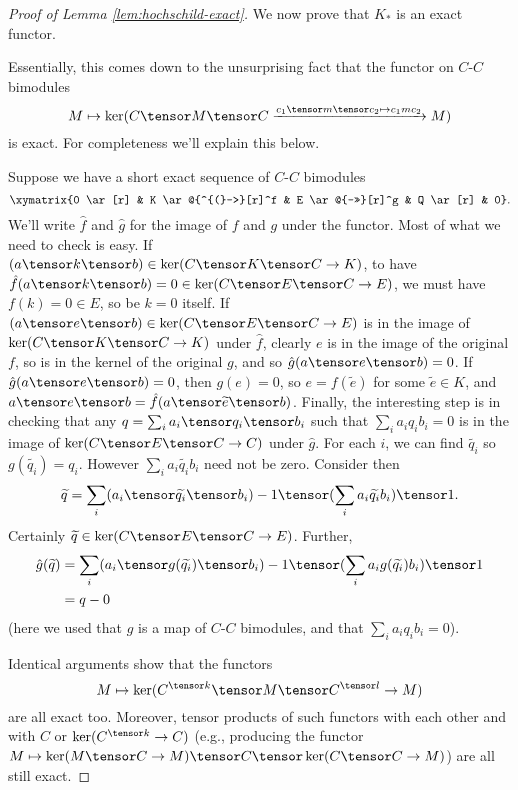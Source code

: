 \begin{proof}[Proof of Lemma \ref{lem:hochschild-exact}]
We now prove that $K_*$ is an exact functor.

Essentially, this comes down to the unsurprising fact that the functor on $C$-$C$ bimodules
\begin{equation*}
M \mapsto \ker(C \tensor M \tensor C \xrightarrow{c_1 \tensor m \tensor c_2 \mapsto c_1 m c_2} M)
\end{equation*}
is exact. For completeness we'll explain this below.

Suppose we have a short exact sequence of $C$-$C$ bimodules $$\xymatrix{0 \ar[r] & K \ar@{^{(}->}[r]^f & E \ar@{->>}[r]^g & Q \ar[r] & 0}.$$
We'll write $\hat{f}$ and $\hat{g}$ for the image of $f$ and $g$ under the functor.
Most of what we need to check is easy.
If $(a \tensor k \tensor b) \in \ker(C \tensor K \tensor C \to K)$, to have $\hat{f}(a \tensor k \tensor b) = 0 \in \ker(C \tensor E \tensor C \to E)$, we must have $f(k) = 0 \in E$, so
be $k=0$ itself. If $(a \tensor e \tensor b) \in \ker(C \tensor E \tensor C \to E)$ is in the image of $\ker(C \tensor K \tensor C \to K)$ under $\hat{f}$, clearly
$e$ is in the image of the original $f$, so is in the kernel of the original $g$, and so $\hat{g}(a \tensor e \tensor b) = 0$.
If $\hat{g}(a \tensor e \tensor b) = 0$, then $g(e) = 0$, so $e = f(\widetilde{e})$ for some $\widetilde{e} \in K$, and $a \tensor e \tensor b = \hat{f}(a \tensor \widetilde{e} \tensor b)$.
Finally, the interesting step is in checking that any $q = \sum_i a_i \tensor q_i \tensor b_i$ such that $\sum_i a_i q_i b_i = 0$ is in the image of $\ker(C \tensor E \tensor C \to C)$ under $\hat{g}$.
For each $i$, we can find $\widetilde{q_i}$ so $g(\widetilde{q_i}) = q_i$. However $\sum_i a_i \widetilde{q_i} b_i$ need not be zero.
Consider then $$\widetilde{q} = \sum_i (a_i \tensor \widetilde{q_i} \tensor b_i) - 1 \tensor (\sum_i a_i \widetilde{q_i} b_i) \tensor 1.$$ Certainly
$\widetilde{q} \in \ker(C \tensor E \tensor C \to E)$. Further,
\begin{align*}
\hat{g}(\widetilde{q}) & = \sum_i (a_i \tensor g(\widetilde{q_i}) \tensor b_i) - 1 \tensor (\sum_i a_i g(\widetilde{q_i}) b_i) \tensor 1 \\
                       & = q - 0
\end{align*}
(here we used that $g$ is a map of $C$-$C$ bimodules, and that $\sum_i a_i q_i b_i = 0$).

Identical arguments show that the functors
\begin{equation}
\label{eq:ker-functor}%
M \mapsto \ker(C^{\tensor k} \tensor M \tensor C^{\tensor l} \to M)
\end{equation}
are all exact too. Moreover, tensor products of such functors with each
other and with $C$ or $\ker(C^{\tensor k} \to C)$ (e.g., producing the functor $M \mapsto \ker(M \tensor C \to M)
\tensor C \tensor \ker(C \tensor C \to M)$) are all still exact.


\end{proof}
